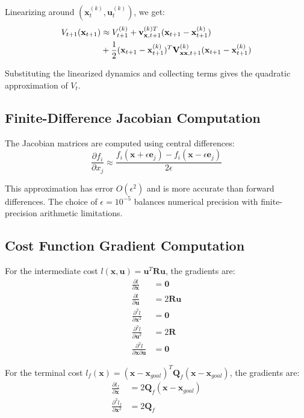 \documentclass[conference]{IEEEtran}
\begin{document}
Linearizing around $(\mathbf{x}_t^{(k)}, \mathbf{u}_t^{(k)})$, we get:
\begin{align}
V_{t+1}(\mathbf{x}_{t+1}) &\approx V_{t+1}^{(k)} + \mathbf{v}_{\mathbf{x},t+1}^{(k)T}(\mathbf{x}_{t+1} - \mathbf{x}_{t+1}^{(k)}) \notag \\
&+ \frac{1}{2}(\mathbf{x}_{t+1} - \mathbf{x}_{t+1}^{(k)})^T\mathbf{V}_{\mathbf{xx},t+1}^{(k)}(\mathbf{x}_{t+1} - \mathbf{x}_{t+1}^{(k)})
\end{align}

Substituting the linearized dynamics and collecting terms gives the quadratic approximation of $V_t$.

\subsection{Finite-Difference Jacobian Computation}

The Jacobian matrices are computed using central differences:
\begin{equation}
\frac{\partial f_i}{\partial x_j} \approx \frac{f_i(\mathbf{x} + \epsilon\mathbf{e}_j) - f_i(\mathbf{x} - \epsilon\mathbf{e}_j)}{2\epsilon}
\end{equation}

This approximation has error $O(\epsilon^2)$ and is more accurate than forward differences. The choice of $\epsilon = 10^{-5}$ balances numerical precision with finite-precision arithmetic limitations.

\subsection{Cost Function Gradient Computation}

For the intermediate cost $l(\mathbf{x}, \mathbf{u}) = \mathbf{u}^T\mathbf{R}\mathbf{u}$, the gradients are:
\begin{align}
\frac{\partial l}{\partial \mathbf{x}} &= \mathbf{0} \\
\frac{\partial l}{\partial \mathbf{u}} &= 2\mathbf{R}\mathbf{u} \\
\frac{\partial^2 l}{\partial \mathbf{x}^2} &= \mathbf{0} \\
\frac{\partial^2 l}{\partial \mathbf{u}^2} &= 2\mathbf{R} \\
\frac{\partial^2 l}{\partial \mathbf{x}\partial \mathbf{u}} &= \mathbf{0}
\end{align}

For the terminal cost $l_f(\mathbf{x}) = (\mathbf{x} - \mathbf{x}_{goal})^T\mathbf{Q}_f(\mathbf{x} - \mathbf{x}_{goal})$, the gradients are:
\begin{align}
\frac{\partial l_f}{\partial \mathbf{x}} &= 2\mathbf{Q}_f(\mathbf{x} - \mathbf{x}_{goal}) \\
\frac{\partial^2 l_f}{\partial \mathbf{x}^2} &= 2\mathbf{Q}_f
\end{align}
\end{document}
